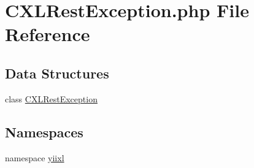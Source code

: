 \hypertarget{CXLRestException_8php}{
\section{CXLRestException.php File Reference}
\label{CXLRestException_8php}
}
\subsection*{Data Structures}
\begin{DoxyCompactItemize}
\item 
class \hyperlink{classCXLRestException}{CXLRestException}
\end{DoxyCompactItemize}
\subsection*{Namespaces}
\begin{DoxyCompactItemize}
\item 
namespace \hyperlink{namespaceyiixl}{yiixl}
\end{DoxyCompactItemize}
